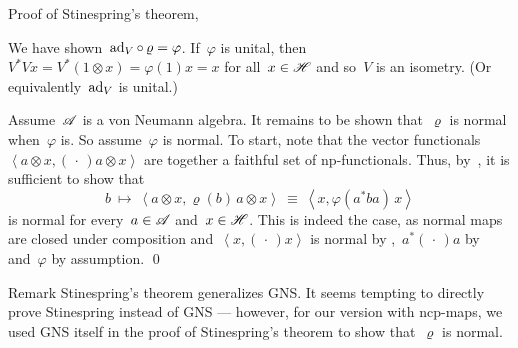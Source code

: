 \begin{parsec}
\begin{point}
\begin{point}{%
    Proof of Stinespring's theorem, }
\begin{point}
We have shown~$\mathrm{ad}_V \mathop{\circ} \varrho = \varphi$.
    If~$\varphi$ is unital,
    then~$V^*Vx = V^* (1\otimes x) = \varphi(1)x=x$
        for all~$x \in \mathscr{H}$ and so~$V$ is an isometry.
    (Or equivalently~$\mathrm{ad}_V$ is unital.)
\end{point}
\begin{point}%
Assume~$\mathscr{A}$ is a von Neumann algebra.
It remains to be shown that~$\varrho$
    is normal when~$\varphi$ is.
So assume~$\varphi$ is normal.
To start, note that
    the vector functionals~$\left< a\otimes x, (\,\cdot\,) a\otimes x\right>$
    are together a faithful set of np-functionals.
Thus, by~,
    it is sufficient
    to show that
\begin{equation*}
    b \ \mapsto \ \left<a \otimes x, \varrho(b) \, a \otimes x \right>
    \ \equiv \ \left<x, \varphi(a^* b a) \,x \right>
\end{equation*}
    is normal for every~$a\in \mathscr{A}$ and~$x \in \mathscr{H}$.
    This is indeed the case, as normal
    maps are closed under composition and~$\left<x, (\,\cdot\,) x\right>$
    is normal by ,~$a^* (\,\cdot\,) a$ by 
    and~$\varphi$ by assumption.
        \qed
\end{point}
\end{point}
\begin{point}{Remark}%
Stinespring's theorem generalizes GNS.
It seems tempting to directly prove Stinespring instead of GNS ---
however, for our version with ncp-maps,
we used GNS itself in the proof of Stinespring's theorem to show
that~$\varrho$ is normal.
\end{point}
\end{point}
\end{parsec}

